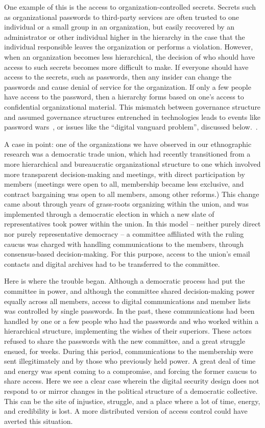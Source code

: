 One example of this is the access to organization-controlled secrets. Secrets
such as organizational passwords to third-party services are often trusted to
one individual or a small group in an organization, but easily recovered by an
administrator or other individual higher in the hierarchy in the case that the
individual responsible leaves the organization or performs a violation. However,
when an organization becomes less hierarchical, the decision of who should have
access to such secrets becomes more difficult to make. If everyone should have
access to the secrets, such as passwords, then any insider can change the
passwords and cause denial of service for the organization. If only a few people
have access to the password, then a hierarchy forms based on one's access to
confidential organizational material. This mismatch between governance structure
and assumed governance structures entrenched in technologies leads to events
like password wars~\cite{kavada2020counterpublics}, or issues like the
``digital vanguard problem'', discussed below.~\cite{gerbaudo2017social}.

A case in point: one of the organizations we have observed in our ethnographic
research was a democratic trade union, which had recently transitioned from a
more hierarchical and bureaucratic organizational structure to one which
involved more transparent decision-making and meetings, with direct
participation by members (meetings were open to all, membership became less
exclusive, and contract bargaining was open to all members, among other
reforms.) This change came about through years of grass-roots organizing within
the union, and was implemented through a democratic election in which a new
slate of representatives took power within the union. In this model -- neither
purely direct nor purely representative democracy -- a committee affiliated with
the ruling caucus was charged with handling communications to the members,
through consensus-based decision-making. For this purpose, access to the union's
email contacts and digital archives had to be transferred to the committee. 

Here is where the trouble began. Although a democratic process had put the
committee in power, and although the committee shared decision-making power
equally across all members, access to digital communications and member lists
was controlled by single passwords. In the past, these communications had been
handled by one or a few people who had the passwords and who worked within a
hierarchical structure, implementing the wishes of their superiors. These actors
refused to share the passwords with the new committee, and a great struggle
ensued, for weeks. During this period, communications to the membership were
sent illegitimately and by those who previously held power. A great deal of time
and energy was spent coming to a compromise, and forcing the former caucus to
share access. Here we see a clear case wherein the digital security design does
not respond to or mirror changes in the political structure of a democratic
collective. This can be the site of injustice, struggle, and a place where a lot
of time, energy, and credibility is lost. A more distributed version of access
control could have averted this situation.

